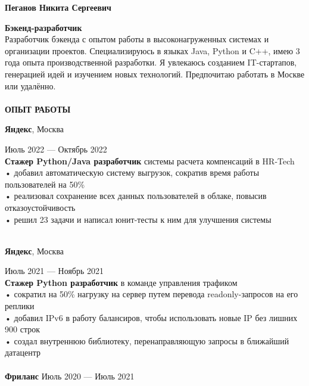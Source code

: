 \documentclass{article}
\begin{document}
\begin{vwcol}[widths={0.8,0.2},
 sep=.8cm, justify=flush,rule=0pt,indent=1em] 
\begin{spacing}{1.1}
\noindent\textbf{\Huge{Пеганов Никита Сергеевич}}\\
\end{spacing}
\noindent\textcolor[rgb]{0.1255,0.2902,0.7843}{\textbf{\Large{Бэкенд-разработчик}}}\\
Разработчик бэкенда с опытом работы в высоконагруженных системах и организации проектов. Специализируюсь в языках Java, Python и C++, имею 3 года опыта производственной разработки. Я увлекаюсь созданием IT-стартапов, генерацией идей и изучением новых технологий. Предпочитаю работать в Москве или удалённо.\\
\\
\noindent\textcolor[rgb]{0.1255,0.2902,0.7843}{\textbf{\Large{ОПЫТ РАБОТЫ}}}\\
\begin{Large}
\textbf{Яндекс}, Москва
\end{Large}
\hspace{185pt}Июль 2022 — Октябрь 2022\\
\textbf{Стажер Python/Java разработчик} системы расчета компенсаций в HR-Tech\\
• добавил автоматическую систему выгрузок, сократив время работы пользователей на 50\%\\
• реализовал сохранение всех данных пользователей в облаке, повысив отказоустойчивость\\
• решил 23 задачи и написал юнит-тесты к ним для улучшения системы\\
\\
\begin{Large}
\textbf{Яндекс}, Москва
\end{Large}
\hspace{190pt}Июль 2021 — Ноябрь 2021\\
\textbf{Стажер Python разработчик} в команде управления трафиком\\
• сократил на 50\% нагрузку на сервер путем перевода readonly-запросов на его реплики\\
• добавил IPv6 в работу балансиров, чтобы использовать новые IP без лишних 900 строк\\
• создал внутреннюю библиотеку, перенаправляющую запросы в ближайший датацентр\\
\\
\textbf{\Large{Фриланс}}
\hspace{250pt}Июль 2020 — Июль 2021\\ 

\end{vwcol}
\end{document}

